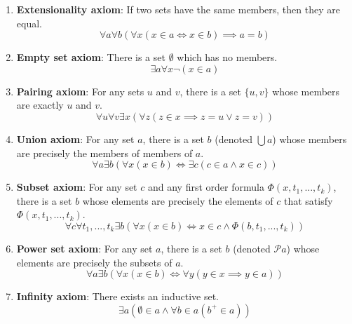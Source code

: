 \documentclass[11pt, oneside]{article}   	%
\theoremstyle{definition}
\begin{document}
\begin{enumerate}

	\item \textbf{Extensionality axiom}: If two sets have the same members, then they are equal. 
	\begin{equation}
		\forall a\forall b (\forall x (x\in a\iff x\in b)\implies a = b)
	\end{equation}
	
	\item \textbf{Empty set axiom}: There is a set $\emptyset$ which has no members.
	\begin{equation}
		\exists a \forall x \neg(x\in a)
	\end{equation}
	
	\item \textbf{Pairing axiom}: For any sets $u$ and $v$, there is a set $\{u, v\}$ whose members are exactly $u$ and $v$.
	\begin{equation}
		\forall u\forall v \exists x (\forall z (z\in x\implies z = u\vee z = v))
	\end{equation}
	
	\item \textbf{Union axiom}: For any set $a$, there is a set $b$ (denoted $\bigcup a$) whose members are precisely the 
	members of members of $a$. 
	\begin{equation}
		\forall a\exists b (\forall x (x\in b)\iff \exists c (c\in a\wedge x\in c))
	\end{equation}
	
	\item \textbf{Subset axiom}: For any set $c$ and any first order formula $\Phi(x, t_1, ..., t_k)$, there is a set $b$ whose 
	elements are precisely the elements of $c$ that satisfy $\Phi(x, t_1, ..., t_k)$. 
	\begin{equation}
		\forall c\forall t_1, ..., t_k\exists b (\forall x (x\in b)\iff x\in c\wedge \Phi(b, t_1, ..., t_k))
	\end{equation}
	
	\item \textbf{Power set axiom}: For any set $a$, there is a set $b$ (denoted $\mathcal P a$) whose elements are 
	precisely the subsets of $a$.
	\begin{equation}
		\forall a\exists b (\forall x (x\in b)\iff \forall y (y\in x\implies y\in a))
	\end{equation}
	
	\item \textbf{Infinity axiom}: There exists an inductive set.
	\begin{equation}
		\exists a (\emptyset\in a\wedge \forall b\in a (b^+\in a))
	\end{equation}
	

\end{enumerate}
\end{document}
